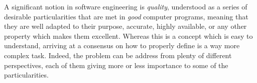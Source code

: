 

A significant notion in software engineering is \textit{quality}, understood as a series of desirable particularities that are met in \textit{good} computer programs, meaning that they are well adapted to their purpose, accurate, highly available, or any other property which makes them excellent.
Whereas this is a concept which is easy to understand, arriving at a consensus on how to properly define is a way more complex task. Indeed, the problem can be address from plenty of different perspectives, each of them giving more or less importance to some of the particularities.

